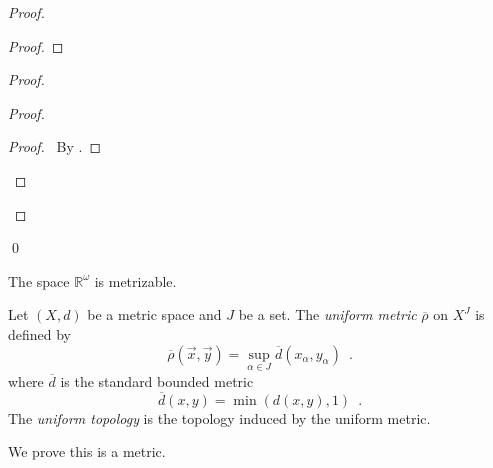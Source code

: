 \begin{proof}
\begin{proof}
  \end{proof}
  \begin{proof}
    \begin{proof}
      \qedstep
      \begin{proof}
        \pf\ By .
      \end{proof}
    \end{proof}
  \end{proof}
  \qed
\end{proof}

\begin{cor}
  The space $\mathbb{R}^\omega$ is metrizable.
\end{cor}

\begin{df}
  Let $(X, d)$ be a metric space and $J$ be a set. The \emph{uniform metric} $\overline{\rho}$ on
  $X^J$ is defined by
  \[ \overline{\rho}(\vec{x}, \vec{y}) = \sup_{\alpha \in J}
  \overline{d}(x_\alpha, y_\alpha) \enspace . \]
  where $\overline{d}$ is the standard bounded metric
  \[ \overline{d}(x, y) = \min(d(x, y), 1) \enspace . \]
   The \emph{uniform topology} is the topology induced by the uniform metric.

  We prove this is a metric.
\end{df}

